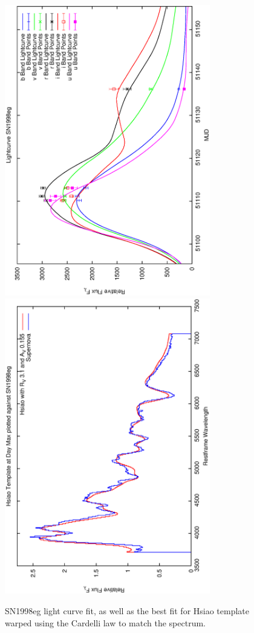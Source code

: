 \clearpage

\begin{figure}[p]
\centering
\includegraphics[angle=-90,width=0.8\textwidth]{./figures/ltcv/SN1998eg_v023_lightcurve.ps}
\hfill
\includegraphics[angle=-90,width=0.8\textwidth]{./figures/hsiao/SN1998eg_v001_hsiao.ps}
\hfill
\caption{SN1998eg light curve fit, as well as the best fit for Hsiao template warped using the Cardelli law to match the spectrum.}
\label{fig:SN1998egfour2}
\end{figure}

